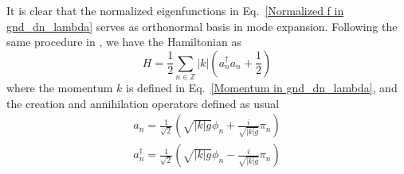 \begin{comment}
Thus, the normalized eigenfunctions are
\begin{equation}
f_n(x) = \sqrt{\frac{2}{L}}
\left\lbrace
\begin{aligned}
  \cos(kx +\frac{1}{2}kL ) &  \quad x < 0  \\
  \pm \sin(kx - \frac{1}{2}kL ) & \quad x > 0   \\
\end{aligned} \right. 
\qquad 
k = \frac{2\pi}{L}( n \pm  \frac{\theta}{\pi} )  \quad n \in \mathbb{Z} 
\end{equation}
Expand the field $\phi = \sum_n \phi_n f_n(x) $, the action and Hamiltonian becomes
\begin{equation}
  S = \frac{g}{2} \int dt \, \sum_{n \in \mathbb{Z} }\left(  \dot{\phi}^2_n + k^2 \phi_n^2 \right) \implies\quad   g \dot{\phi}_n  = \pi_n \quad \implies H =  
\frac{1}{2g}\sum_{n \in \mathbb{Z} } \pi_n^2 + ( kg )^2  \phi_n^2 
\end{equation}
\end{comment}

It is clear that the normalized eigenfunctions in Eq.~\eqref{Normalized f in gnd_dn_lambda} serves as orthonormal basis in mode expansion. Following the same procedure in , we have the Hamiltonian as
\begin{equation}
\label{H in gnd_dn_lambda}
H = \frac{1}{2} \sum_{n \in \mathbb{Z} } |k|  (a^{\dagger}_n a_n + \frac{1}{2} )
\end{equation}
where the momentum $k$ is defined in Eq.~\eqref{Momentum in gnd_dn_lambda}, and the creation and annihilation operators defined as usual
\begin{equation}
\begin{aligned}
a_n = \frac{1}{\sqrt{2}} ( \sqrt{ |k|g} \phi_n + \frac{i }{\sqrt{|k|g} }\pi_n  ) \\
a^{\dagger}_n = \frac{1}{\sqrt{2}} ( \sqrt{ |k|g} \phi_n - \frac{i }{\sqrt{|k|g} }\pi_n  ) \\
\end{aligned}
\end{equation}

